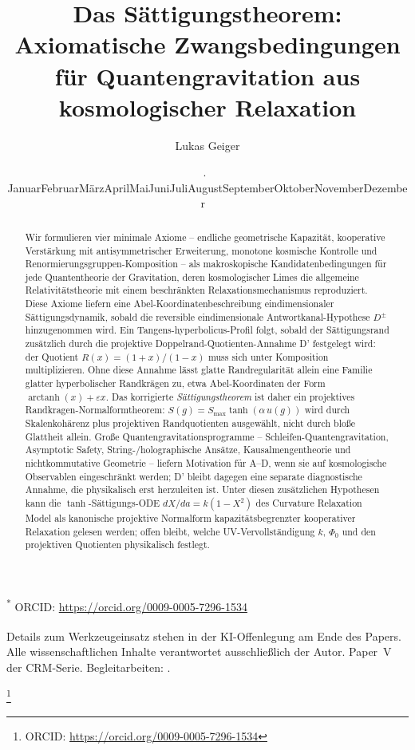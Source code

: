 \documentclass[aps,prd,twocolumn,superscriptaddress,nofootinbib]{revtex4-2}
\newcommand{\germanmonthname}{%
  \ifcase\month\or Januar\or Februar\or März\or April\or Mai\or Juni\or Juli\or August\or September\or Oktober\or November\or Dezember\fi%
}
\newcommand{\germantoday}{\number\day.~\germanmonthname~\number\year}
\begin{document}
\vfill
{\small
\noindent\textsuperscript{*} ORCID: \url{https://orcid.org/0009-0005-7296-1534}\par
\noindent\textsuperscript{\textdagger} Details zum Werkzeugeinsatz stehen in der KI-Offenlegung am Ende des Papers. Alle wissenschaftlichen Inhalte verantwortet ausschließlich der Autor. Paper~V der CRM-Serie. Begleitarbeiten: \cite{Geiger2026,Geiger2026b,Geiger2026c,Geiger2026d}.\par
}

\clearpage
\twocolumngrid
{}

\iffalse


\title{Das Sättigungstheorem: Axiomatische Zwangsbedingungen\texorpdfstring{\\}{ }für Quantengravitation aus kosmologischer Relaxation}

\author{Lukas Geiger}
\thanks{ORCID: \url{https://orcid.org/0009-0005-7296-1534}}

\date{\germantoday}

\begin{abstract}
Wir formulieren vier minimale Axiome -- endliche geometrische Kapazität, kooperative Verstärkung mit antisymmetrischer Erweiterung, monotone kosmische Kontrolle und Renormierungsgruppen-Komposition -- als makroskopische Kandidatenbedingungen für jede Quantentheorie der Gravitation, deren kosmologischer Limes die allgemeine Relativitätstheorie mit einem beschränkten Relaxationsmechanismus reproduziert. Diese Axiome liefern eine Abel-Koordinatenbeschreibung eindimensionaler Sättigungsdynamik, sobald die reversible eindimensionale Antwortkanal-Hypothese $D^\pm$ hinzugenommen wird. Ein Tangens-hyperbolicus-Profil folgt, sobald der Sättigungsrand zusätzlich durch die projektive Doppelrand-Quotienten-Annahme D' festgelegt wird: der Quotient $R(x)=(1+x)/(1-x)$ muss sich unter Komposition multiplizieren. Ohne diese Annahme lässt glatte Randregularität allein eine Familie glatter hyperbolischer Randkrägen zu, etwa Abel-Koordinaten der Form $\operatorname{arctanh}(x)+\varepsilon x$. Das korrigierte \textit{Sättigungstheorem} ist daher ein projektives Randkragen-Normalformtheorem: $S(g)=S_{\max}\tanh(\alpha\,u(g))$ wird durch Skalenkohärenz plus projektiven Randquotienten ausgewählt, nicht durch bloße Glattheit allein. Große Quantengravitationsprogramme -- Schleifen-Quantengravitation, Asymptotic Safety, String-/holographische Ansätze, Kausalmengentheorie und nichtkommutative Geometrie -- liefern Motivation für A--D, wenn sie auf kosmologische Observablen eingeschränkt werden; D' bleibt dagegen eine separate diagnostische Annahme, die physikalisch erst herzuleiten ist. Unter diesen zusätzlichen Hypothesen kann die $\tanh$-Sättigungs-ODE $dX/da = k(1-X^2)$ des Curvature Relaxation Model als kanonische projektive Normalform kapazitätsbegrenzter kooperativer Relaxation gelesen werden; offen bleibt, welche UV-Vervollständigung $k$, $\Phi_0$ und den projektiven Quotienten physikalisch festlegt.
\end{abstract}
\end{document}
